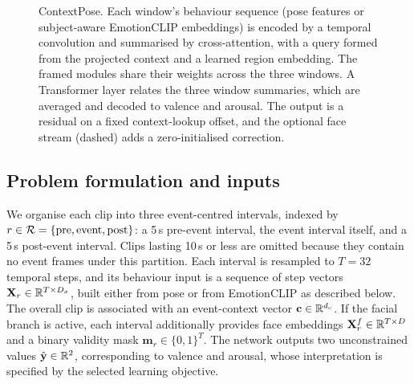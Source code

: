 \begin{figure}[t]
\caption{ContextPose. Each window's behaviour sequence (pose features or subject-aware EmotionCLIP embeddings) is encoded by a temporal convolution and summarised by cross-attention, with a query formed from the projected context and a learned region embedding. The framed modules share their weights across the three windows. A Transformer layer relates the three window summaries, which are averaged and decoded to valence and arousal. The output is a residual on a fixed context-lookup offset, and the optional face stream (dashed) adds a zero-initialised correction.}
\label{fig:arch}
\end{figure}

\subsection{Problem formulation and inputs}
\label{sec:inputs}

We organise each clip into three event-centred intervals, indexed by $r\in\mathcal{R}=\{\text{pre},\text{event},\text{post}\}$: a 5\,s pre-event interval, the event interval itself, and a 5\,s post-event interval. Clips lasting 10\,s or less are omitted because they contain no event frames under this partition. Each interval is resampled to $T=32$ temporal steps, and its behaviour input is a sequence of step vectors $\mathbf{X}_r\in\mathbb{R}^{T\times D_x}$, built either from pose or from EmotionCLIP as described below. The overall clip is associated with an event-context vector $\mathbf{c}\in\mathbb{R}^{d_c}$. If the facial branch is active, each interval additionally provides face embeddings $\mathbf{X}^f_r\in\mathbb{R}^{T\times D}$ and a binary validity mask $\mathbf{m}_r\in\{0,1\}^{T}$. The network outputs two unconstrained values $\hat{\mathbf{y}}\in\mathbb{R}^2$, corresponding to valence and arousal, whose interpretation is specified by the selected learning objective.

